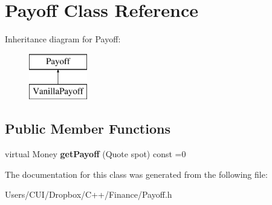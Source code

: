\hypertarget{class_payoff}{}\section{Payoff Class Reference}
\label{class_payoff}
Inheritance diagram for Payoff\+:\begin{figure}[H]
\begin{center}
\leavevmode
\includegraphics[height=2.000000cm]{class_payoff}
\end{center}
\end{figure}
\subsection*{Public Member Functions}
\begin{DoxyCompactItemize}
\item 
\hypertarget{class_payoff_a908e732330294a111345b4183ddb025b}{}\label{class_payoff_a908e732330294a111345b4183ddb025b} 
virtual Money {\bfseries get\+Payoff} (Quote spot) const =0
\end{DoxyCompactItemize}


The documentation for this class was generated from the following file\+:\begin{DoxyCompactItemize}
\item 
Users/\+C\+U\+I/\+Dropbox/\+C++/\+Finance/Payoff.\+h\end{DoxyCompactItemize}
